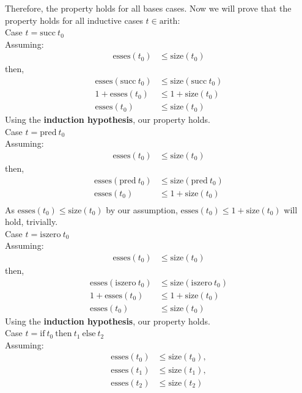 \documentclass[letterpaper]{article}
\theoremstyle{plain}
\theoremstyle{definition}
\theoremstyle{remark}
\begin{document}
Therefore, the property holds for all bases cases. Now we will prove that the property holds for all inductive cases $t\in\text{arith}$:\\[1em]
Case $t=\text{succ}~t_0$\\[1em]
Assuming:
\begin{align*}
    \text{esses}(t_0)&\leq\text{size}(t_0)
\end{align*}
then,
\begin{align*}
    \text{esses}(\text{succ}~t_0)&\leq\text{size}(\text{succ}~t_0)\\
    1+\text{esses}(t_0)&\leq1+\text{size}(t_0)\\
    \text{esses}(t_0)&\leq\text{size}(t_0)
\end{align*}
Using the \textbf{induction hypothesis}, our property holds.\\[1em]
Case $t=\text{pred}~t_0$\\[1em]
Assuming:
\begin{align*}
    \text{esses}(t_0)&\leq\text{size}(t_0)
\end{align*}
then,
\begin{align*}
    \text{esses}(\text{pred}~t_0)&\leq\text{size}(\text{pred}~t_0)\\
    \text{esses}(t_0)&\leq1+\text{size}(t_0)\\
\end{align*}
As $\text{esses}(t_0)\leq\text{size}(t_0)$ by our assumption, $\text{esses}(t_0)\leq1+\text{size}(t_0)$ will hold, trivially.\\[1em]
Case $t=\text{iszero}~t_0$\\[1em]
Assuming:
\begin{align*}
    \text{esses}(t_0)&\leq\text{size}(t_0)
\end{align*}
then,
\begin{align*}
    \text{esses}(\text{iszero}~t_0)&\leq\text{size}(\text{iszero}~t_0)\\
    1+\text{esses}(t_0)&\leq1+\text{size}(t_0)\\
    \text{esses}(t_0)&\leq\text{size}(t_0)
\end{align*}
Using the \textbf{induction hypothesis}, our property holds.\\[1em]
Case $t=\text{if}~t_0~\text{then}~t_1~\text{else}~t_2$\\[1em]
Assuming:
\begin{align*}
    \text{esses}(t_0)&\leq\text{size}(t_0),\\
    \text{esses}(t_1)&\leq\text{size}(t_1),\\
    \text{esses}(t_2)&\leq\text{size}(t_2)
\end{align*}
\end{document}
